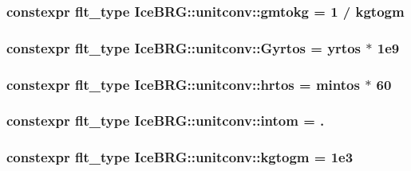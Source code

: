 \subsubsection[{gmtokg}]{\setlength{\rightskip}{0pt plus 5cm}constexpr {\bf flt\+\_\+type} Ice\+B\+R\+G\+::unitconv\+::gmtokg = 1 / {\bf kgtogm}}\label{namespaceIceBRG_1_1unitconv_ab9b925d541a5302d95841d5fd7971133}
\hypertarget{namespaceIceBRG_1_1unitconv_ac74d772981f57a4574a544e40f694f16}{}
\subsubsection[{Gyrtos}]{\setlength{\rightskip}{0pt plus 5cm}constexpr {\bf flt\+\_\+type} Ice\+B\+R\+G\+::unitconv\+::\+Gyrtos = {\bf yrtos} $\ast$ 1e9}\label{namespaceIceBRG_1_1unitconv_ac74d772981f57a4574a544e40f694f16}
\hypertarget{namespaceIceBRG_1_1unitconv_ab482eba5c67b88c2874dc202aaee9bca}{}
\subsubsection[{hrtos}]{\setlength{\rightskip}{0pt plus 5cm}constexpr {\bf flt\+\_\+type} Ice\+B\+R\+G\+::unitconv\+::hrtos = {\bf mintos} $\ast$ 60}\label{namespaceIceBRG_1_1unitconv_ab482eba5c67b88c2874dc202aaee9bca}
\hypertarget{namespaceIceBRG_1_1unitconv_ad0cb9cc83967bfc48c1fe9268eaef1db}{}
\subsubsection[{intom}]{\setlength{\rightskip}{0pt plus 5cm}constexpr {\bf flt\+\_\+type} Ice\+B\+R\+G\+::unitconv\+::intom = .}\label{namespaceIceBRG_1_1unitconv_ad0cb9cc83967bfc48c1fe9268eaef1db}
\hypertarget{namespaceIceBRG_1_1unitconv_a0139c7377db85ea33ac749dda7f08b6d}{}
\subsubsection[{kgtogm}]{\setlength{\rightskip}{0pt plus 5cm}constexpr {\bf flt\+\_\+type} Ice\+B\+R\+G\+::unitconv\+::kgtogm = 1e3}\label{namespaceIceBRG_1_1unitconv_a0139c7377db85ea33ac749dda7f08b6d}
\hypertarget{namespaceIceBRG_1_1unitconv_a41a582b56116556e72f9829566bec57d}{}
